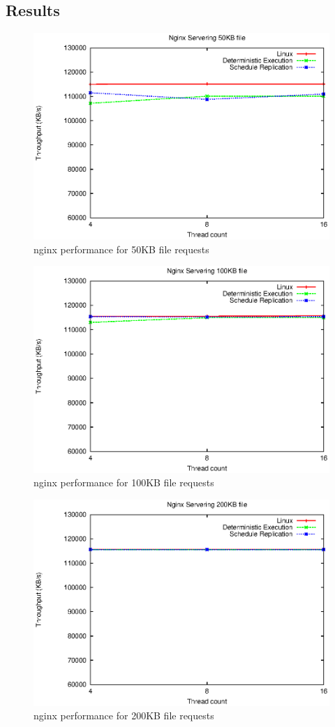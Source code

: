 \subsection{Results}
\begin{figure}
\centering
\includegraphics[width=0.8\columnwidth]{figures/ng_throughput_50k}
\caption{nginx performance for 50KB file requests}
\label{f:ng_50k}
\end{figure}
\begin{figure}
\centering
\includegraphics[width=0.8\columnwidth]{figures/ng_throughput_100k}
\caption{nginx performance for 100KB file requests}
\label{f:ng_100k}
\end{figure}
\begin{figure}
\centering
\includegraphics[width=0.8\columnwidth]{figures/ng_throughput_200k}
\caption{nginx performance for 200KB file requests}
\label{f:ng_200k}
\end{figure}

